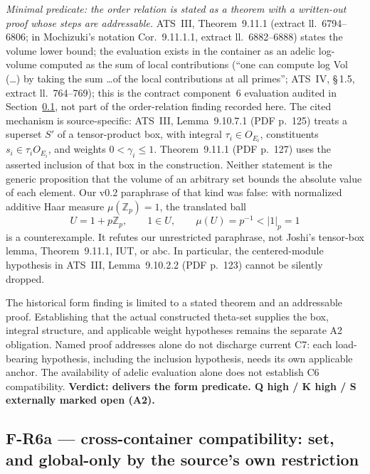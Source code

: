 \documentclass[11pt,a4paper]{article}
\begin{document}
\emph{Minimal predicate: the order relation is stated as a theorem with a
written-out proof whose steps are addressable.} ATS~III, Theorem~9.11.1
(extract ll.~6794--6806; in Mochizuki's notation Cor.~9.11.1.1, extract
ll.~6882--6888) states the volume lower bound; the evaluation exists in the
container as an adelic log-volume computed as the sum of local contributions
(``one can compute log Vol (\dots) by taking the sum \dots of the local
contributions at all primes''; ATS~IV, \S\,1.5, extract ll.~764--769); this is
the contract component~6 evaluation audited in Section~\ref{sec:r6cc}, not
part of the order-relation finding recorded here. The cited mechanism is source-specific: ATS~III,
Lemma~9.10.7.1 (PDF p.~125) treats a superset $S'$ of a tensor-product
box, with integral $\tau_i\in O_{E_i}$, constituents $s_i\in\tau_i O_{E_i}$,
and weights $0<\gamma_i\le1$. Theorem~9.11.1 (PDF p.~127)
uses the asserted inclusion of that box in the construction.
Neither statement is the generic proposition that the volume of
an arbitrary set bounds the absolute value of each element.
Our v0.2 paraphrase of that kind was false: with normalized
additive Haar measure $\mu(\mathbb Z_p)=1$, the translated ball
\[
 U=1+p\mathbb Z_p,\qquad 1\in U,\qquad
 \mu(U)=p^{-1}<|1|_p=1
\]
is a counterexample. It refutes our unrestricted paraphrase,
not Joshi's tensor-box lemma, Theorem~9.11.1, IUT, or abc.
In particular, the centered-module hypothesis in ATS~III,
Lemma~9.10.2.2 (PDF p.~123) cannot be silently dropped.

The historical form finding is limited to a stated theorem and an
addressable proof. Establishing that the actual constructed
theta-set supplies the box, integral structure, and applicable
weight hypotheses remains the separate A2 obligation. Named
proof addresses alone do not discharge current C7: each
load-bearing hypothesis, including the inclusion hypothesis,
needs its own applicable anchor. The availability of adelic
evaluation alone does not establish C6 compatibility.
\textbf{Verdict: delivers the form predicate. Q high / K high / S externally
marked open (A2).}

\subsection{F-R6a --- cross-container compatibility: set, and global-only by
the source's own restriction}\label{sec:r6cc}
\end{document}
